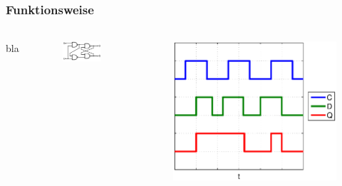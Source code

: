 \begin{frame}
    \frametitle{Funktionsweise}
    \framesubtitle{}
    \begin{columns}[c]
            bla 
            \begin{figure}[H]
            \begin{center}
                    \includegraphics[scale=0.6]{./img/schaltung/D-Latch.png}
            \end{center}
            \end{figure}
            \begin{figure}[H]
            \begin{center}
                    \includegraphics[scale=0.3]{./img/Aufgabe_2_c.eps}
            \end{center}
            \end{figure}
    \end{columns}
\end{frame}
